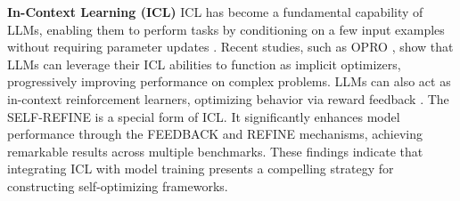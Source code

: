 \textbf{In-Context Learning (ICL)} 
ICL has become a fundamental capability of LLMs, enabling them to perform tasks by conditioning on a few input examples without requiring parameter updates \citep{brown2020language}. Recent studies, such as OPRO \citep{yang2024largelanguagemodelsoptimizers}, show that LLMs can leverage their ICL abilities to function as implicit optimizers, progressively improving performance on complex problems. LLMs can also act as in-context reinforcement learners, optimizing behavior via reward feedback \citep{monea2024llms}. The SELF-REFINE \citep{madaan2024self} is a special form of ICL. It significantly enhances model performance through the FEEDBACK and REFINE mechanisms, achieving remarkable results across multiple benchmarks. 
These findings indicate that integrating ICL with model training presents a compelling strategy for constructing self-optimizing frameworks.